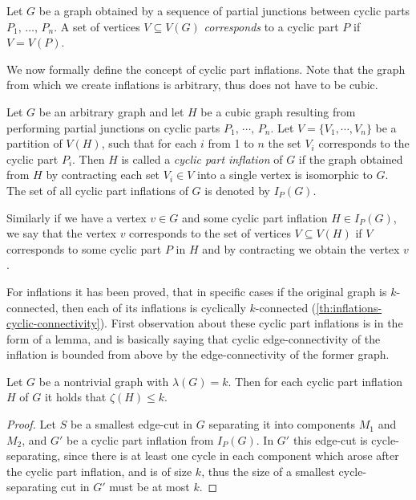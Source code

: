 \documentclass[12pt, twoside]{book}
\begin{document}
Let $G$ be a graph obtained by a sequence of partial junctions between cyclic parts $P_1,\,\dots,\,P_n$. A set of vertices $V\subseteq V(G)$ \textit{corresponds} to a cyclic part $P$ if $V=V(P)$.

We now formally define the concept of cyclic part inflations. Note that the graph from which we create inflations is arbitrary, thus does not have to be cubic.

\begin{definition}
	\label{def:cyclic-part-inflation}
	Let $G$ be an arbitrary graph and let $H$ be a cubic graph resulting from performing partial junctions on cyclic parts $P_1,\,\cdots,\,P_n$. Let $V=\{V_1,\cdots, V_n\}$ be a partition of $V(H)$, such that for each $i$ from 1 to $n$ the set $V_i$ corresponds to the cyclic part $P_i$. Then $H$ is called a \textit{cyclic part inflation} of $G$ if the graph obtained from $H$ by contracting each set $V_i\in V$ into a single vertex is isomorphic to $G$. The set of all cyclic part inflations of $G$ is denoted by $I_P(G)$.
\end{definition}

Similarly if we have a vertex $v\in G$ and some cyclic part inflation $H\in I_P(G)$, we say that the vertex $v$ corresponds to the set of vertices $V\subseteq V(H)$ if $V$ corresponds to some cyclic part $P$ in $H$ and by contracting we obtain the vertex $v$.

For inflations it has been proved, that in specific cases if the original graph is $k$-connected, then each of its inflations is cyclically $k$-connected (\cref{th:inflations-cyclic-connectivity}). First observation about these cyclic part inflations is in the form of a lemma, and is basically saying that cyclic edge-connectivity of the inflation is bounded from above by the edge-connectivity of the former graph.

\begin{lemma}
	Let $G$ be a nontrivial graph with $\lambda(G)=k$. Then for each cyclic part inflation $H$ of $G$ it holds that $\zeta(H)\leq k$.
\end{lemma}

\begin{proof}
	Let $S$ be a smallest edge-cut in $G$ separating it into components $M_1$ and $M_2$, and $G'$ be a cyclic part inflation from $I_P(G)$. In $G'$ this edge-cut is cycle-separating, since there is at least one cycle in each component which arose after the cyclic part inflation, and is of size $k$, thus the size of a smallest cycle-separating cut in $G'$ must be at most $k$.
\end{proof}
\end{document}
